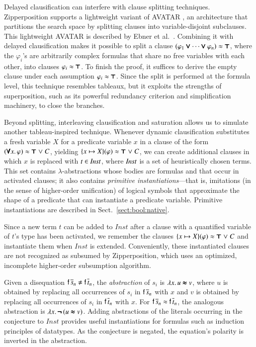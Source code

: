 Delayed clausification can interfere with clause splitting techniques.
Zipperposition supports a lightweight variant of AVATAR \cite{av-2014-avatar},
an architecture that partitions the search space by
splitting clauses into variable-disjoint subclauses. This lightweight AVATAR is described
by Ebner et al.\ \cite[Sect.~7]{2021-ebt-unifying-splitting}. Combining it
with delayed clausification makes it possible to split a %
clause $(\varphi_1 \pmb{\lor} \cdots \pmb{\lor} \varphi_n) \approx \pmb{\top}$, where
the $\varphi_i$'s are arbitrarily complex formulas that share no free
variables with each other, into clauses $\varphi_i \approx \pmb{\top}$.
%
To finish the proof, it suffices to derive the empty clause under each assumption
$\varphi_i \approx \pmb{\top}$. Since the split is performed at the formula level, this
technique resembles tableaux, but it exploits the strengths of superposition,
such as its powerful redundancy criterion and simplification machinery, to
close the branches.

Beyond splitting, interleaving clausification and saturation allows us to
simulate another tableau-inspired technique. Whenever dynamic clausification
substitutes a fresh variable $X$ for a predicate variable $x$ in a clause of the
form $(\pmb{\forall} x.\, \varphi) \approx \pmb{\top} \mathrel\lor C$, yielding $\{x
\mapsto\nobreak X\}(\varphi) \approx \pmb{\top} \mathrel\lor C$, we can create additional
clauses in which $x$ is replaced with $t \in \mathit{Inst}$, where $\mathit{Inst}$ is a
set of heuristically chosen terms. This set contains $\lambda$-abstractions
whose bodies are formulas and that occur in activated clauses; it also contains
\emph{primitive instantiations}---that is, imitations (in the sense of
higher-order unification) of logical symbols that approximate the shape of a
predicate that can instantiate a predicate variable. Primitive instantiations
are described in Sect.~\ref{sect:bool:native}.

Since a new term $t$ can be added to $\mathit{Inst}$ after a clause with a
quantified variable of $t$'s type has been activated, we remember the clauses
$\{x \mapsto X\}(\varphi) \approx \pmb{\top}\allowbreak \mathrel\lor C$ and instantiate them when
$\mathit{Inst}$ is extended. Conveniently, these instantiated clauses are not
recognized as subsumed by Zipperposition, which uses an optimized, incomplete
higher-order subsumption algorithm.

Given a disequation $\cst{f}\,\tuple{s}{n} \not\eq \cst{f}\,\tuple{t}{n}$, the
\emph{abstraction} of $s_i$ is $\lambda x.\, u \pmb{\approx} v$, where $u$ is obtained by
replacing all occurrences of $s_i$ in $\mathsf{f}\,\overline{s}_{n}$ with $x$ and $v$ is
obtained by replacing all occurrences of $s_i$ in
$\mathsf{f}\,\overline{t}_{n}$ with $x$. For $\mathsf{f}\,\overline{s}_{n} \approx
\mathsf{f}\,\overline{t}_{n}$, the analogous abstraction is $\lambda x.\, \pmb{\neg\,} (u \pmb{\approx}
v)$.
%
%
Adding abstractions of the literals occurring in the conjecture to $\mathit{Inst}$
provides useful instantiations for formulas such as induction principles of
datatypes. As the conjecture is negated,
the equation's polarity is inverted in the
abstraction. 

